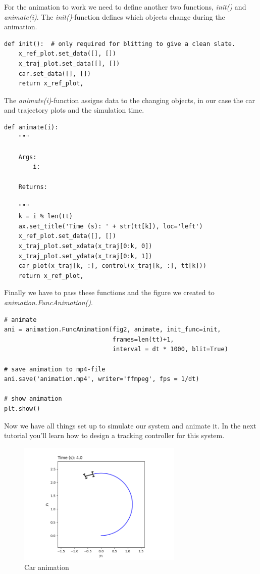 \documentclass[a4paper,11pt,headings=standardclasses]{scrartcl}%
\begin{document}
For the animation to work we need to define another two functions, \emph{init()} and \emph{animate(i)}. The \emph{init()}-function defines which objects change during the animation.
\begin{lstlisting}
def init():  # only required for blitting to give a clean slate.
    x_ref_plot.set_data([], [])
    x_traj_plot.set_data([], [])
    car.set_data([], [])
    return x_ref_plot,
\end{lstlisting}
The \emph{animate(i)}-function assigns data to the changing objects, in our case the car and trajectory plots and the simulation time.
\begin{lstlisting}
def animate(i):
    """

    Args:
        i:

    Returns:

    """
    k = i % len(tt)
    ax.set_title('Time (s): ' + str(tt[k]), loc='left')
    x_ref_plot.set_data([], [])
    x_traj_plot.set_xdata(x_traj[0:k, 0])
    x_traj_plot.set_ydata(x_traj[0:k, 1])
    car_plot(x_traj[k, :], control(x_traj[k, :], tt[k]))
    return x_ref_plot,
\end{lstlisting}
Finally we have to pass these functions and the figure we created to \emph{animation.FuncAnimation()}.
\begin{lstlisting}
# animate
ani = animation.FuncAnimation(fig2, animate, init_func=init, 
                              frames=len(tt)+1,
                              interval = dt * 1000, blit=True)
                              
# save animation to mp4-file
ani.save('animation.mp4', writer='ffmpeg', fps = 1/dt)

# show animation
plt.show()
\end{lstlisting}
Now we have all things set up to simulate our system and animate it. In the next tutorial you'll learn how to design a tracking controller for this system.
\begin{figure}[ht]
	\centering
	\includegraphics[width=0.7\textwidth]{img/animation}
	\caption{Car animation}
	\label{fig:animation}
\end{figure}
\end{document}
